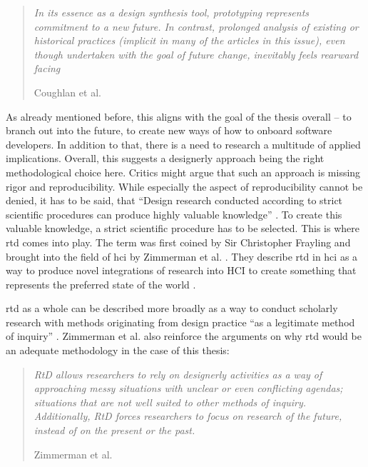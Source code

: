 \begin{quote}
  \textit{In its essence as a design synthesis tool, prototyping represents commitment to a new future. In contrast, prolonged analysis of existing or historical practices (implicit in many of the articles in this issue), even though undertaken with the goal of future change, inevitably feels rearward facing}

  \footnotesize{Coughlan et al. \cite[p. 132]{coughlan2007prototypes}}
\end{quote}

As already mentioned before, this aligns with the goal of the thesis overall -- to branch out into the future, to create new ways of how to onboard software developers. In addition to that, there is a need to research a multitude of applied implications. Overall, this suggests a designerly approach being the right methodological choice here. Critics might argue that such an approach is missing rigor and reproducibility. While especially the aspect of reproducibility cannot be denied, it has to be said, that \enquote{Design research conducted according to strict scientific procedures can produce highly valuable knowledge} \cite[p. 60]{stolterman2008nature}. To create this valuable knowledge, a strict scientific procedure has to be selected. This is where \gls{rtd} comes into play. The term was first coined by Sir Christopher Frayling \cite{frayling1994research} and brought into the field of \gls{hci} by Zimmerman et al. \cite{zimmerman2007research}. They describe \gls{rtd} in \gls{hci} as a way to produce novel integrations of research into HCI to create something that represents the preferred state of the world \cite[p. 493]{zimmerman2007research}.

\gls{rtd} as a whole can be described more broadly as a way to conduct scholarly research with methods originating from design practice \cite{zimmerman2014research} \enquote{as a legitimate method of inquiry} \cite[p. 310]{zimmerman2010analysis}. Zimmerman et al. also reinforce the arguments on why \gls{rtd} would be an adequate methodology in the case of this thesis:

\begin{quote}
  \textit{RtD allows researchers to rely on designerly activities as a way of approaching messy situations with unclear or even conflicting agendas; situations that are not well suited to other methods of inquiry. Additionally, RtD forces researchers to focus on research of the future, instead of on the present or the past.}

  \footnotesize{Zimmerman et al. \cite[p. 310]{zimmerman2010analysis}}
\end{quote}

